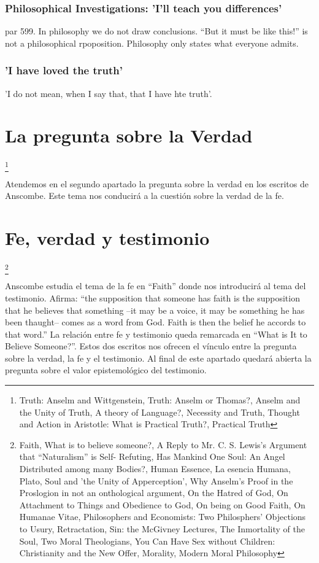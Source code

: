 \documentclass[../main.tex]{subfiles}
\begin{document}
\subsubsection{Philosophical Investigations: 'I'll teach you differences'}
par 599. In philosophy we do not draw conclusions. ``But it must be like this!'' is not a philosophical rpoposition. Philosophy only states what everyone admits.

\subsubsection{'I have loved the truth'}

'I do not mean, when I say that, that I have hte truth'.

\section{La pregunta sobre la Verdad}
\footnote{
Truth: Anselm and Wittgenstein, 
Truth: Anselm or Thomas?, 
Anselm and the Unity of Truth, 
A theory of Language?, 
Necessity and Truth, 
Thought and Action in Aristotle: What is Practical Truth?, 
Practical Truth
}

Atendemos en el segundo apartado la pregunta sobre la verdad en los escritos de Anscombe. Este tema nos conducirá a la cuestión sobre la verdad de la fe.

\section{Fe, verdad y testimonio}
\footnote{
Faith, 
What is to believe someone?, 
A Reply to Mr. C. S. Lewis's Argument that “Naturalism” is Self- Refuting, 
Has Mankind One Soul: An Angel Distributed among many Bodies?, 
Human Essence, 
La esencia Humana, 
Plato, Soul and 'the Unity of Apperception', 
Why Anselm's Proof in the Proslogion in not an onthological argument, 
On the Hatred of God, 
On Attachment to Things and Obedience to God, 
On being on Good Faith, 
On Humanae Vitae, 
Philosophers and Economists: Two Philosphers' Objections to Usury, 
Retractation, 
Sin: the McGivney Lectures, 
The Inmortality of the Soul, 
Two Moral Theologians, 
You Can Have Sex without Children: Christianity and the New Offer, 
Morality, 
Modern Moral Philosophy
}

Anscombe estudia el tema de la fe en ``Faith'' donde nos introducirá al tema del testimonio. Afirma: ``the supposition that someone has faith is the supposition that he believes that something --it may be a voice, it may be something he has been thaught-- comes as a word from God. Faith is then the belief he accords to that word.'' La relación entre fe y testimonio queda remarcada en ``What is It to Believe Someone?''. Estos dos escritos nos ofrecen el vínculo entre la pregunta sobre la verdad, la fe y el testimonio. Al final de este apartado quedará abierta la pregunta sobre el valor epistemológico del testimonio.
\end{document}
